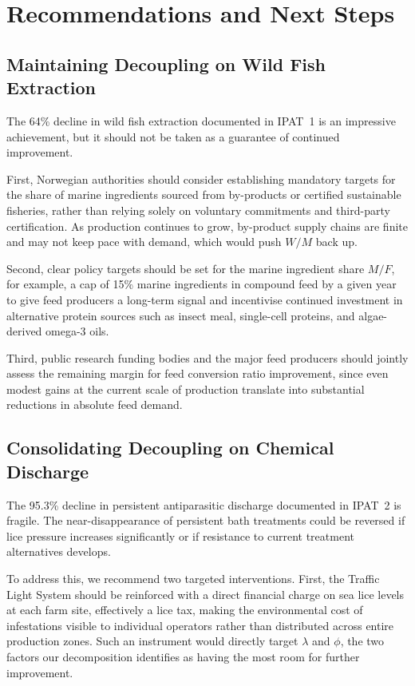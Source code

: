 \documentclass[12pt, a4paper]{report}
\begin{document}
\chapter{Recommendations and Next Steps}

\section{Maintaining Decoupling on Wild Fish Extraction}

The 64\% decline in wild fish extraction documented in IPAT~1 is an impressive achievement, but it should not be taken as a guarantee of continued improvement.

First, Norwegian authorities should consider establishing mandatory targets for the share of marine ingredients sourced from by-products or certified sustainable fisheries, rather than relying solely on voluntary commitments and third-party certification. As production continues to grow, by-product supply chains are finite and may not keep pace with demand, which would push $W/M$ back up.

Second, clear policy targets should be set for the marine ingredient share $M/F$, for example, a cap of 15\% marine ingredients in compound feed by a given year to give feed producers a long-term signal and incentivise continued investment in alternative protein sources such as insect meal, single-cell proteins, and algae-derived omega-3 oils.

Third, public research funding bodies and the major feed producers should jointly assess the remaining margin for feed conversion ratio improvement, since even modest gains at the current scale of production translate into substantial reductions in absolute feed demand.

\section{Consolidating Decoupling on Chemical Discharge}

The 95.3\% decline in persistent antiparasitic discharge documented in IPAT~2 is fragile. The near-disappearance of persistent bath treatments could be reversed if lice pressure increases significantly or if resistance to current treatment alternatives develops.

To address this, we recommend two targeted interventions. First, the Traffic Light System should be reinforced with a direct financial charge on sea lice levels at each farm site, effectively a lice tax, making the environmental cost of infestations visible to individual operators rather than distributed across entire production zones. Such an instrument would directly target $\lambda$ and $\phi$, the two factors our decomposition identifies as having the most room for further improvement.
\end{document}
